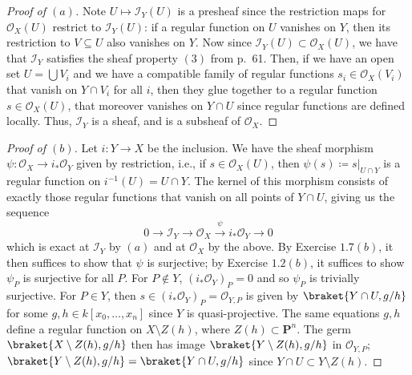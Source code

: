 \documentclass[10pt]{article}
\theoremstyle{definition}
\theoremstyle{remark}
\numberwithin{equation}{section}
\numberwithin{figure}{subsubsection}
\newcommand{\OO}{\mathcal{O}}
\begin{document}
\begin{proof}[Proof of $(a)$]
  Note $U \mapsto \mathscr{I}_Y(U)$ is a presheaf since the restriction maps for
  $\OO_X(U)$ restrict to $\mathscr{I}_Y(U)$: if a regular function on $U$
  vanishes on $Y$, then its restriction to $V \subseteq U$ also vanishes on
  $Y$. Now since $\mathscr{I}_Y(U) \subset \OO_X(U)$, we have that
  $\mathscr{I}_Y$ satisfies the sheaf property $(3)$ from p.~61. Then, if we
  have an open set $U = \bigcup V_i$ and we have a compatible family of regular
  functions $s_i \in
  \OO_X(V_i)$ that vanish on $Y \cap V_i$ for all $i$, then they glue together
  to a regular function $s \in \OO_X(U)$, that moreover vanishes on $Y \cap U$ since
  regular functions are defined locally. Thus, $\mathscr{I}_Y$ is a sheaf, and is a subsheaf of $\OO_X$.
\end{proof}
\begin{proof}[Proof of $(b)$]
  Let $i\colon Y \to X$ be the inclusion. We have the sheaf morphism $\psi\colon \OO_X \to i_*\OO_Y$ given by restriction, i.e., if $s \in \OO_X(U)$, then $\psi(s) \coloneqq s\vert_{U \cap Y}$ is a regular function on $i^{-1}(U) = U \cap Y$. The kernel of this morphism consists of exactly those regular functions that vanish on all points of $Y \cap U$, giving us the sequence
  \begin{equation*}
    0 \to \mathscr{I}_Y \to \OO_X \overset{\psi}{\to} i_*\OO_Y \to 0
  \end{equation*}
  which is exact at $\mathscr{I}_Y$ by $(a)$ and at $\OO_X$ by the above. By
  Exercise $1.7(b)$, it then suffices to show that $\psi$ is surjective; by
  Exercise $1.2(b)$, it suffices to show $\psi_P$ is surjective for all $P$. For $P \notin Y$, $(i_*\OO_Y)_P = 0$ and so $\psi_P$ is trivially surjective. For $P \in Y$, then $s \in (i_*\OO_Y)_P = \OO_{Y,P}$ is given by $\braket{Y \cap U,g/h}$ for some $g,h \in k[x_0,\ldots,x_n]$ since $Y$ is quasi-projective. The same equations $g,h$ define a regular function on $X \setminus Z(h)$, where $Z(h) \subset \mathbf{P}^n$. The germ $\braket{X \setminus Z(h),g/h}$ then has image $\braket{Y \setminus Z(h),g/h}$ in $\OO_{Y,P}$; $\braket{Y \setminus Z(h),g/h} = \braket{Y \cap U,g/h}$ since $Y \cap U \subset Y \setminus Z(h)$.
\end{proof}
\end{document}
